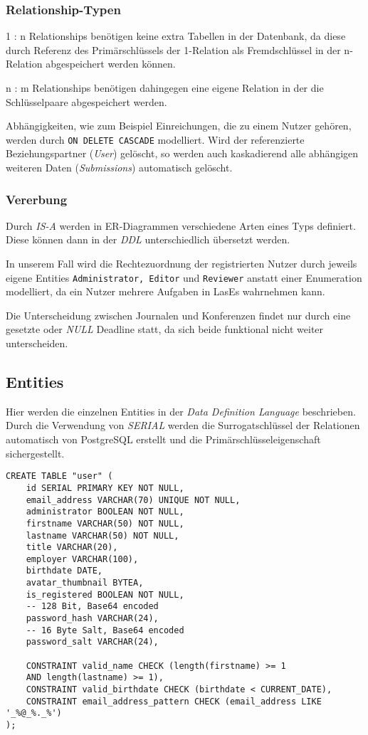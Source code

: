 \subsubsection{Relationship-Typen}

1 : n Relationships benötigen keine extra Tabellen in der Datenbank, da diese durch Referenz des Primärschlüssels der 1-Relation als Fremdschlüssel in der n-Relation abgespeichert werden können.

n : m Relationships benötigen dahingegen eine eigene Relation in der die Schlüsselpaare abgespeichert werden.

Abhängigkeiten, wie zum Beispiel Einreichungen, die zu einem Nutzer gehören, werden durch \texttt{ON DELETE CASCADE} modelliert. Wird der referenzierte Beziehungspartner (\emph{User}) gelöscht, so werden auch kaskadierend alle abhängigen weiteren Daten (\emph{Submissions}) automatisch gelöscht.

\subsubsection{Vererbung}

Durch \emph{IS-A} werden in ER-Diagrammen verschiedene Arten eines Typs definiert. Diese können dann in der \emph{DDL} unterschiedlich übersetzt werden.

In unserem Fall wird die Rechtezuordnung der registrierten Nutzer durch jeweils eigene Entities \texttt{Administrator, Editor} und \texttt{Reviewer} anstatt einer Enumeration modelliert, da ein Nutzer mehrere Aufgaben in LasEs wahrnehmen kann.

Die Unterscheidung zwischen Journalen und Konferenzen findet nur durch eine gesetzte oder \emph{NULL} Deadline statt, da sich beide funktional nicht weiter unterscheiden.

\subsection{Entities}

Hier werden die einzelnen Entities in der \emph{Data Definition Language} beschrieben. Durch die Verwendung von \emph{SERIAL} werden die Surrogatschlüssel der Relationen automatisch von PostgreSQL erstellt und die Primärschlüsseleigenschaft sichergestellt.\\

\begin{lstlisting}[caption={DDL von Nutzern}]
CREATE TABLE "user" (
	id SERIAL PRIMARY KEY NOT NULL,
	email_address VARCHAR(70) UNIQUE NOT NULL,
	administrator BOOLEAN NOT NULL,
	firstname VARCHAR(50) NOT NULL,
	lastname VARCHAR(50) NOT NULL,
	title VARCHAR(20),
	employer VARCHAR(100),
	birthdate DATE,
	avatar_thumbnail BYTEA,
	is_registered BOOLEAN NOT NULL,
	-- 128 Bit, Base64 encoded
	password_hash VARCHAR(24),
	-- 16 Byte Salt, Base64 encoded
	password_salt VARCHAR(24),

	CONSTRAINT valid_name CHECK (length(firstname) >= 1
	AND length(lastname) >= 1),
	CONSTRAINT valid_birthdate CHECK (birthdate < CURRENT_DATE),
	CONSTRAINT email_address_pattern CHECK (email_address LIKE '_%@_%._%')
);
\end{lstlisting}

